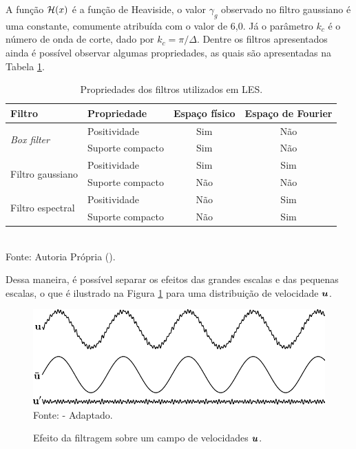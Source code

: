 A função $\mathcal{H}(x)$ é a função de Heaviside, o valor $\gamma_g$ observado no filtro gaussiano é uma constante, comumente atribuída com o valor de 6,0. Já o parâmetro $k_c$ é o número de onda de corte, dado por $k_c=\pi/\Delta$. Dentre os filtros apresentados ainda é possível observar algumas propriedades, as quais são apresentadas na Tabela \ref{tab:filters2}.

\begin{table}[h!]
    \centering
    \caption{Propriedades dos filtros utilizados em LES.}
    \begin{tabular}{llcc}
        \hline
        Filtro                               & Propriedade      & Espaço físico & Espaço de Fourier \\\hline
        \multirow{2}{*}{\textit{Box filter}} & Positividade     & Sim           & Não               \\
                                             & Suporte compacto & Sim           & Não               \\\hline
        \multirow{2}{*}{Filtro gaussiano}    & Positividade     & Sim           & Sim               \\
                                             & Suporte compacto & Não           & Não               \\\hline
        \multirow{2}{*}{Filtro espectral}    & Positividade     & Não           & Sim               \\
                                             & Suporte compacto & Não           & Sim               \\\hline
    \end{tabular}
    \\Fonte: Autoria Própria (\the\year).
    \label{tab:filters2}
\end{table}


Dessa maneira, é possível separar os efeitos das grandes escalas e das pequenas escalas, o que é ilustrado na Figura \ref{fig:EfeitoFiltragem} para uma distribuição de velocidade $\boldsymbol{u}$.

\begin{figure}[h!]
    \centering
    \caption{Efeito da filtragem sobre um campo de velocidades $\boldsymbol{u}$.}
    \includegraphics[width=.75\linewidth]{Figuras/efeito_filtragem.pdf}
    \\Fonte:  - Adaptado.
    \label{fig:EfeitoFiltragem}
\end{figure}

